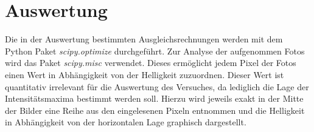 \section{Auswertung}
Die in der Auswertung bestimmten Ausgleichsrechnungen werden mit
dem Python Paket \emph{scipy.optimize}\cite{scipy} durchgeführt. Zur Analyse der aufgenommen Fotos
wird das Paket \emph{scipy.misc}\cite{scipy} verwendet. Dieses ermöglicht jedem Pixel der Fotos einen
Wert in Abhängigkeit von der Helligkeit zuzuordnen. Dieser Wert ist quantitativ irrelevant für die
Auswertung des Versuches, da lediglich die Lage der Intensitätsmaxima bestimmt werden soll. Hierzu wird
jeweils exakt in der Mitte der Bilder eine Reihe aus den eingelesenen Pixeln entnommen und die Helligkeit
in Abhängigkeit von der horizontalen Lage graphisch dargestellt.  

\FloatBarrier

\FloatBarrier

\FloatBarrier

